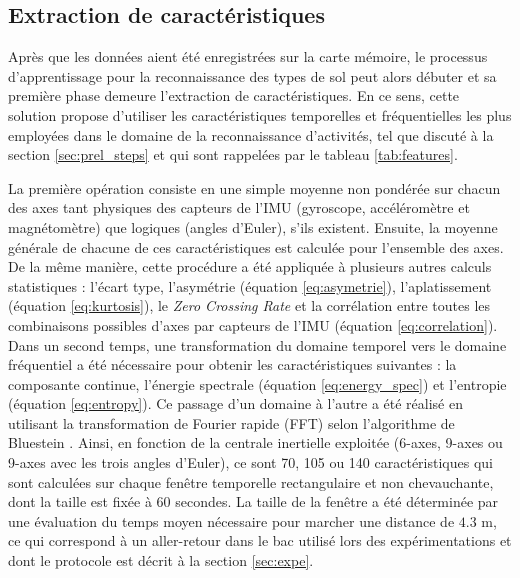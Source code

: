 \subsection{Extraction de caractéristiques}

Après que les données aient été enregistrées sur la carte mémoire, le processus d'apprentissage pour la reconnaissance des types de sol peut alors débuter et sa première phase demeure l'extraction de caractéristiques. En ce sens, cette solution propose d'utiliser les caractéristiques temporelles et fréquentielles les plus employées dans le domaine de la reconnaissance d'activités, tel que discuté à la section \ref{sec:prel_steps} et qui sont rappelées par le tableau \ref{tab:features}.

La première opération consiste en une simple moyenne non pondérée sur chacun des axes tant \og{}physiques\fg{} des capteurs de l'\acs{IMU} (gyroscope, accéléromètre et magnétomètre) que \og{}logiques\fg{} (angles d'Euler), s'ils existent. Ensuite, la moyenne générale de chacune de ces caractéristiques est calculée pour l'ensemble des axes. De la même manière, cette procédure a été appliquée à plusieurs autres calculs statistiques : l'écart type, l'asymétrie (équation \ref{eq:asymetrie}), l'aplatissement (équation \ref{eq:kurtosis}), le \textit{Zero Crossing Rate} et la corrélation entre toutes les combinaisons possibles d'axes par capteurs de l'\acs{IMU} (équation \ref{eq:correlation}). Dans un second temps, une transformation du domaine temporel vers le domaine fréquentiel a été nécessaire pour obtenir les caractéristiques suivantes : la composante continue, l'énergie spectrale (équation \ref{eq:energy_spec}) et l'entropie  (équation \ref{eq:entropy}). Ce passage d'un domaine à l'autre a été réalisé en utilisant la transformation de Fourier rapide (\acs{FFT}) selon l'algorithme de Bluestein \citep{Bluestein1970}. Ainsi, en fonction de la centrale inertielle exploitée (6-axes, 9-axes ou 9-axes avec les trois angles d'Euler), ce sont 70, 105 ou 140 caractéristiques qui sont calculées sur chaque fenêtre temporelle rectangulaire et non chevauchante, dont la taille est fixée à 60 secondes. La taille de la fenêtre a été déterminée par une évaluation du temps moyen nécessaire pour marcher une distance de $4.3$ m, ce qui correspond à un aller-retour dans le bac utilisé lors des expérimentations et dont le protocole est décrit à la section \ref{sec:expe}.

